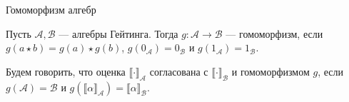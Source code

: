 \documentclass[aspectratio=169]{beamer}
\begin{document}
\begin{frame}{Гомоморфизм алгебр}
\begin{defrus}Пусть $\mathcal{A}, \mathcal{B}$ --- алгебры Гейтинга. Тогда $g: \mathcal{A} \rightarrow \mathcal{B}$ --- гомоморфизм,
если $g(a \star b) = g(a) \star g(b)$, $g(0_\mathcal{A}) = 0_\mathcal{B}$ и $g(1_\mathcal{A}) = 1_\mathcal{B}$.\end{defrus}
\begin{defrus}Будем говорить, что оценка $\llbracket\cdot\rrbracket_\mathcal{A}$ согласована
с $\llbracket\cdot\rrbracket_\mathcal{B}$ и гомоморфизмом $g$, если $g(\mathcal{A}) = \mathcal{B}$ и
$g(\llbracket\alpha\rrbracket_\mathcal{A}) = \llbracket\alpha\rrbracket_\mathcal{B}$.
\end{defrus}
\end{frame}
\end{document}
